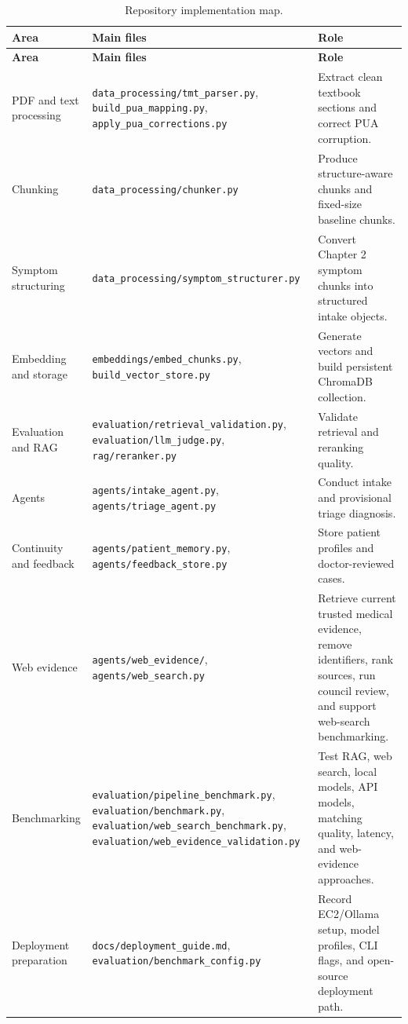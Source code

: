 \begin{longtable}{p{} p{} p{}}
\caption{Repository implementation map.}
\label{tab:repo_implementation_map}\\
\toprule
\textbf{Area} & \textbf{Main files} & \textbf{Role}\\
\midrule
\endfirsthead
\toprule
\textbf{Area} & \textbf{Main files} & \textbf{Role}\\
\midrule
\endhead
PDF and text processing & \texttt{data\_processing/tmt\_parser.py}, \texttt{build\_pua\_mapping.py}, \texttt{apply\_pua\_corrections.py} & Extract clean textbook sections and correct PUA corruption.\\
Chunking & \texttt{data\_processing/chunker.py} & Produce structure-aware chunks and fixed-size baseline chunks.\\
Symptom structuring & \texttt{data\_processing/symptom\_structurer.py} & Convert Chapter 2 symptom chunks into structured intake objects.\\
Embedding and storage & \texttt{embeddings/embed\_chunks.py}, \texttt{build\_vector\_store.py} & Generate vectors and build persistent ChromaDB collection.\\
Evaluation and RAG & \texttt{evaluation/retrieval\_validation.py}, \texttt{evaluation/llm\_judge.py}, \texttt{rag/reranker.py} & Validate retrieval and reranking quality.\\
Agents & \texttt{agents/intake\_agent.py}, \texttt{agents/triage\_agent.py} & Conduct intake and provisional triage diagnosis.\\
Continuity and feedback & \texttt{agents/patient\_memory.py}, \texttt{agents/feedback\_store.py} & Store patient profiles and doctor-reviewed cases.\\
Web evidence & \texttt{agents/web\_evidence/}, \texttt{agents/web\_search.py} & Retrieve current trusted medical evidence, remove identifiers, rank sources, run council review, and support web-search benchmarking.\\
Benchmarking & \texttt{evaluation/pipeline\_benchmark.py}, \texttt{evaluation/benchmark.py}, \texttt{evaluation/web\_search\_benchmark.py}, \texttt{evaluation/web\_evidence\_validation.py} & Test RAG, web search, local models, API models, matching quality, latency, and web-evidence approaches.\\
Deployment preparation & \texttt{docs/deployment\_guide.md}, \texttt{evaluation/benchmark\_config.py} & Record EC2/Ollama setup, model profiles, CLI flags, and open-source deployment path.\\

\end{longtable}
